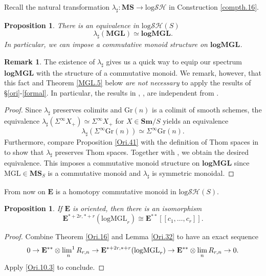 \documentclass[11pt, a4paper]{amsart}
\newtheorem{prop}[thm]{Proposition}
\theoremstyle{definition}
\newtheorem{rmk}[thm]{Remark}
\numberwithin{equation}{subsection}
\newcommand{\Sm}{\mathbf{Sm}}
\newcommand{\limit}{\mathop{\rm lim}}
\newcommand{\limitone}{\mathop{\rm lim^1}}
\newcommand{\Gr}{{\mathrm{Gr}}}
\newcommand{\MGL}{{\mathrm{MGL}}}
\newcommand{\logMGL}{{\mathrm{logMGL}}}
\newcommand{\spectMGL}{{\mathbf{MGL}}}
\newcommand{\spectlogMGL}{{\mathbf{logMGL}}}
\newcommand{\ringE}{\mathbf{E}}
\newcommand{\inflogSH}{\mathrm{log}\mathcal{SH}}
\newcommand{\MS}{\mathbf{MS}}
\begin{document}
Recall the natural transformation
$\lambda_\sharp \colon \MS\to \inflogSH$ in Construction \ref{compth.16}.
\begin{prop}
There is an equivalence in $\inflogSH(S)$
$$
\lambda_\sharp(\spectMGL)\simeq \spectlogMGL.
$$
In particular,
we can impose a commutative monoid structure on $\spectlogMGL$.
\end{prop}
\begin{rmk} The existence of $\lambda_\sharp$ gives us a quick way to equip our spectrum $\spectlogMGL$ with the structure of a commutative monoid. 
    We remark, however, that this fact and Theorem \ref{MGL.5} below
\emph{are not necessary} to apply the results of \S \ref{ori}-\ref{formal}. In particular, the results in \cite{BLMP}, \cite{BLPO}, \cite{BLPO2} are independent from \cite{AHI}.
\end{rmk}
\begin{proof}
Since $\lambda_\sharp$ preserves colimits and $\Gr(n)$ is a colimit of smooth schemes,
the equivalence $\lambda_\sharp (\Sigma^\infty X_+)\simeq \Sigma^\infty X_+$ for $X\in \Sm/S$ yields an equivalence
\[
\lambda_\sharp (\Sigma^\infty \Gr(n))\simeq \Sigma^\infty \Gr(n).
\]
Furthermore, compare Proposition \ref{Ori.41} with the definition of Thom spaces in \cite[\S 3]{AHI} to show that $\lambda_\sharp$ preserves Thom spaces.
Together with \cite[Proposition 7.1]{AHI},
we obtain the desired equivalence.
This imposes a commutative monoid structure on $\spectlogMGL$ since $\MGL\in \MS_S$ is a commutative monoid and $\lambda_\sharp$ is symmetric monoidal.
\end{proof}



From now on $\ringE$ is a homotopy commutative monoid in $\inflogSH(S)$.

\begin{prop}
\label{MGL.2}
If $\ringE$ is oriented, 
then there is an isomorphism
\[
\ringE^{*+2r,*+r}(\logMGL_r)
\cong
\ringE^{**}[[c_1,\ldots,c_r]].
\]
\end{prop}
\begin{proof}
Combine Theorem \ref{Ori.16} and Lemma \ref{Ori.32} to have an exact sequence
\[
0
\to
\ringE^{**}\otimes \limitone_{n} R_{r,n}
\to
\ringE^{*+2r,*+r}(\logMGL_r)
\to
\ringE^{**}\otimes \limit_n R_{r,n}
\to
0.
\]
Apply \eqref{Ori.10.3} to conclude.
\end{proof}
\end{document}
